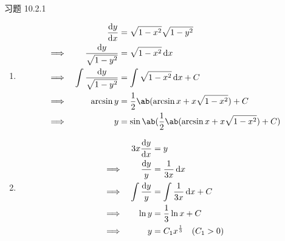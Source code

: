 \begin{problem}
    习题 10.2.1
    \begin{solution}
        \begin{enumerate}
            \item[\textbf{1)}]
            $$
            \begin{aligned}
                & & \dv{y}{x} & = \sqrt{1 - x^2} \sqrt{1 - y^2} \\
                \implies & & \frac{\dd{y}}{\sqrt{1 - y^2}} & = \sqrt{1 - x^2} \dd{x} \\
                \implies & & \int \frac{\dd{y}}{\sqrt{1 - y^2}} & = \int \sqrt{1 - x^2} \dd{x} + C \\
                \implies & & \arcsin y & = \frac{1}{2} \ab(\arcsin x + x \sqrt{1 - x^2}) + C \\
                \implies & & y & = \sin \ab(\frac{1}{2} \ab(\arcsin x + x \sqrt{1 - x^2}) + C)
            \end{aligned}
            $$

            \item[\textbf{3)}]
            $$
            \begin{aligned}
                & & 3x \dv{y}{x} & = y \\
                \implies & & \frac{\dd{y}}{y} & = \frac{1}{3x} \dd{x} \\
                \implies & & \int \frac{\dd{y}}{y} & = \int \frac{1}{3x} \dd{x} + C \\
                \implies & & \ln y & = \frac{1}{3} \ln x + C \\
                \implies & & y & = C_1 x^{\frac{1}{3}} \quad (C_1 > 0)
            \end{aligned}
            $$
        \end{enumerate}
    \end{solution}
\end{problem}


